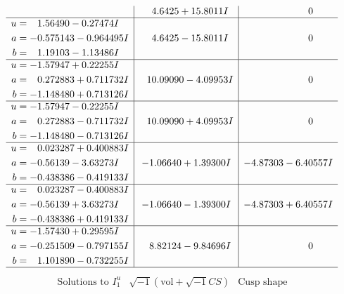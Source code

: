 \documentclass[1p]{elsarticle_modified}
\theoremstyle{definition}
\newcommand{\I}{\sqrt{-1}}
\begin{document}
$$\begin{array}{c|c|c}
 & \phantom{-}4.6425 + 15.8011 I & \phantom{-0.000000 } 0 \\ \hline\begin{aligned}
u &= \phantom{-}1.56490 - 0.27474 I \\
a &= -0.575143 - 0.964495 I \\
b &= \phantom{-}1.19103 - 1.13486 I\end{aligned}
 & \phantom{-}4.6425 - 15.8011 I & \phantom{-0.000000 } 0 \\ \hline\begin{aligned}
u &= -1.57947 + 0.22255 I \\
a &= \phantom{-}0.272883 + 0.711732 I \\
b &= -1.148480 + 0.713126 I\end{aligned}
 & \phantom{-}10.09090 - 4.09953 I & \phantom{-0.000000 } 0 \\ \hline\begin{aligned}
u &= -1.57947 - 0.22255 I \\
a &= \phantom{-}0.272883 - 0.711732 I \\
b &= -1.148480 - 0.713126 I\end{aligned}
 & \phantom{-}10.09090 + 4.09953 I & \phantom{-0.000000 } 0 \\ \hline\begin{aligned}
u &= \phantom{-}0.023287 + 0.400883 I \\
a &= -0.56139 - 3.63273 I \\
b &= -0.438386 - 0.419133 I\end{aligned}
 & -1.06640 + 1.39300 I & -4.87303 - 6.40557 I \\ \hline\begin{aligned}
u &= \phantom{-}0.023287 - 0.400883 I \\
a &= -0.56139 + 3.63273 I \\
b &= -0.438386 + 0.419133 I\end{aligned}
 & -1.06640 - 1.39300 I & -4.87303 + 6.40557 I \\ \hline\begin{aligned}
u &= -1.57430 + 0.29595 I \\
a &= -0.251509 - 0.797155 I \\
b &= \phantom{-}1.101890 - 0.732255 I\end{aligned}
 & \phantom{-}8.82124 - 9.84696 I & \phantom{-0.000000 } 0\\
 \hline 
 \end{array}$$\newpage$$\begin{array}{c|c|c}  
\text{Solutions to }I^u_{1}& \I (\text{vol} + \sqrt{-1}CS) & \text{Cusp shape}\\

\end{array}$$
\end{document}
